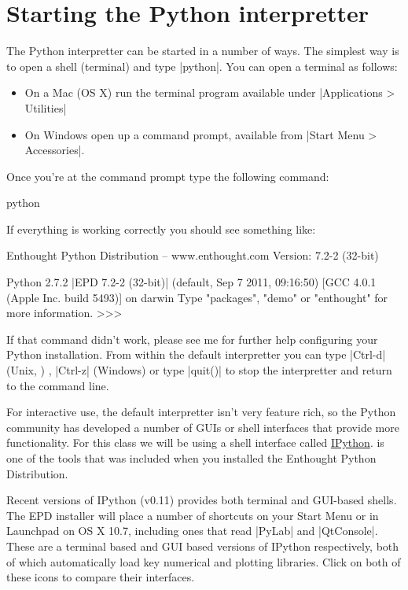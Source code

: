 \section{Starting the Python interpretter}

The Python interpretter can be started in a number of ways. The simplest
way is to open a shell (terminal) and type |python|. You can open a terminal as follows:
%
\begin{itemize}
    \item On a Mac (OS X) run the terminal program available under |Applications > Utilities|
    \item On Windows open up a command prompt, available from |Start Menu > Accessories|. 
\end{itemize}
%

Once you're at the command prompt type the following command:
\begin{bash}
python
\end{bash}
% 
If everything is working correctly you should see something like:
%
\begin{python}
Enthought Python Distribution -- www.enthought.com
Version: 7.2-2 (32-bit)

Python 2.7.2 |EPD 7.2-2 (32-bit)| (default, Sep  7 2011, 09:16:50) 
[GCC 4.0.1 (Apple Inc. build 5493)] on darwin
Type "packages", "demo" or "enthought" for more information.
>>>     
\end{python}
%
If that command didn't work, please see me for further help configuring your Python installation. From within the default
interpretter you can type |Ctrl-d| (Unix, \OSX) , |Ctrl-z| (Windows) or type |quit()| to stop the interpretter and return to the
command line.

For interactive use, the default interpretter isn't very feature rich,
so the Python community has developed a number of GUIs or shell
interfaces that provide more functionality. For this class we will be
using a shell interface called \href{http://ipython.org/}{IPython}. \ipython is one of the tools that was included when you installed the Enthought Python Distribution.

Recent versions of IPython (v0.11) provides both terminal and GUI-based
shells. The EPD installer will place a number of shortcuts on your Start
Menu or in Launchpad on OS X 10.7, including ones that read
|PyLab| and |QtConsole|. These are a terminal based
and GUI based versions of IPython respectively, both of which
automatically load key numerical and plotting libraries. Click on both
of these icons to compare their interfaces.

